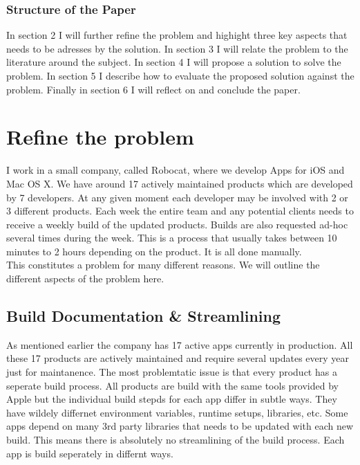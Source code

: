 \documentclass{ituthesis}
\begin{document}
\subsection{Structure of the Paper}

In section 2 I will further refine the problem and highight three key aspects that needs to be adresses by the solution. In section 3 I will relate the problem to the literature around the subject. In section 4 I will propose a solution to solve the problem. In section 5 I describe how to evaluate the proposed solution against the problem. Finally in section 6 I will reflect on and conclude the paper.

\chapter{Refine the problem}

I work in a small company, called Robocat, where we develop Apps for iOS and Mac OS X. We have around 17 actively maintained products which are developed by 7 developers. At any given moment each developer may be involved with 2 or 3 different products. Each week the entire team and any potential clients needs to receive a weekly build of the updated products. Builds are also requested ad-hoc several times during the week. This is a process that usually takes between 10 minutes to 2 hours depending on the product. It is all done manually.\\

This constitutes a problem for many different reasons. We will outline the different aspects of the problem here.

\section{Build Documentation \& Streamlining}

As mentioned earlier the company has 17 active apps currently in production. All these 17 products are actively maintained and require several updates every year just for maintanence. The most problemtatic issue is that every product has a seperate build process. All products are build with the same tools provided by Apple but the individual build stepds for each app differ in subtle ways. They have wildely differnet environment variables, runtime setups, libraries, etc. Some apps depend on many 3rd party libraries that needs to be updated with each new build. This means there is absolutely no streamlining of the build process. Each app is build seperately in differnt ways. \\
\end{document}
